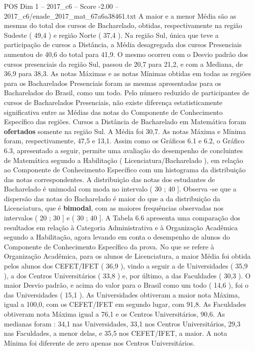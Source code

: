 \begin{textsample}{POS Dim 1 – 2017\_c6 – Score -2.00 – 2017\_c6/enade\_2017\_mat\_67a6a38461.txt}
A maior e a menor Média são as mesmas do total dos cursos de Bacharelado, obtidas, respectivamente na região Sudeste ( 49,4 ) e região Norte ( 37,4 ).
Na região Sul, única que teve a participação de cursos a Distância, a Média desagregada dos cursos Presenciais aumentou de 40,6 do total para 41,9.
O mesmo ocorreu com o Desvio padrão dos cursos presenciais da região Sul, passou de 20,7 para 21,2, e com a Mediana, de 36,9 para 38,3.
As notas Máximas e as notas Mínimas obtidas em todas as regiões para os Bacharelados Presenciais foram as mesmas apresentadas para os Bacharelados do Brasil, como um todo.
Pelo número reduzido de participantes de cursos de Bacharelados Presenciais, não existe diferença estatisticamente significativa entre as Médias das notas do Componente de Conhecimento Específico das regiões.
Cursos a Distância de Bacharelado em Matemática foram \textbf{ofertados} somente na região Sul.
A Média foi 30,7.
As notas Máxima e Mínima foram, respectivamente, 47,5 e 13,1.
Assim como os Gráficos 6.1 e 6.2, o Gráfico 6.3, apresentado a seguir, permite uma avaliação do desempenho de concluintes de Matemática segundo a Habilitação ( Licenciatura/Bacharelado ), em relação ao Componente de Conhecimento Específico com um histograma da distribuição das notas correspondentes.
A distribuição das notas dos estudantes de Bacharelado é unimodal com moda no intervalo ( 30 ; 40 ].
Observa -se que a dispersão das notas do Bacharelado é maior do que a da distribuição da Licenciatura, que é \textbf{bimodal}, com as maiores frequências observadas nos intervalos ( 20 ; 30 ] e ( 30 ; 40 ].
A Tabela 6.6 apresenta uma comparação dos resultados em relação à Categoria Administrativa e à Organização Acadêmica segundo a Habilitação, agora levando em conta o desempenho de alunos do Componente de Conhecimento Específico da prova.
No que se refere à Organização Acadêmica, para os alunos de Licenciatura, a maior Média foi obtida pelos alunos dos CEFET/IFET ( 36,9 ), vindo a seguir a de Universidades ( 35,9 ), a dos Centros Universitários ( 33,8 ) e, por último, a das Faculdades ( 30,3 ).
O maior Desvio padrão, e acima do valor para o Brasil como um todo ( 14,6 ), foi o das Universidades ( 15,1 ).
As Universidades obtiveram a maior nota Máxima, igual a 100,0, com os CEFET/IFET em segundo lugar, com 91,8.
As Faculdades obtiveram nota Máxima igual a 76,1 e os Centros Universitários, 90,6.
As medianas foram : 34,1 nas Universidades, 33,1 nos Centros Universitários, 29,3 nas Faculdades, a menor delas, e 35,5 nos CEFET/IFET, a maior.
A nota Mínima foi diferente de zero apenas nos Centros Universitários.

\end{textsample}
